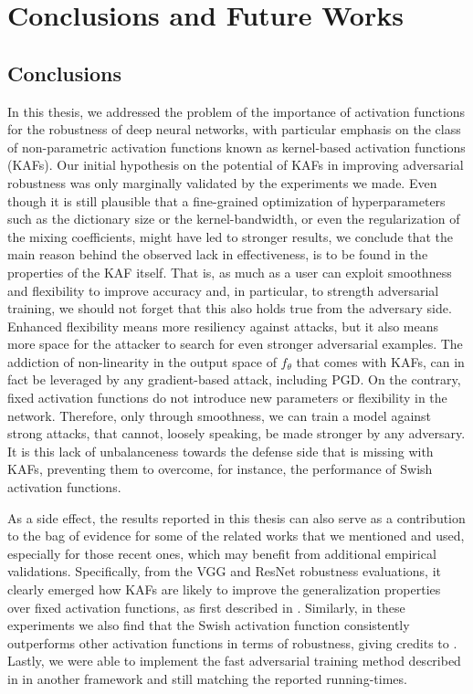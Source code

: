 \documentclass[LaM,binding=0.6cm]{./packages/sapthesis/sapthesis}
\begin{document}
\chapter{Conclusions and Future Works}

        \label{chap:8}
        \section{Conclusions}

        In this thesis, we addressed the problem of the importance of activation functions for the robustness of deep neural networks, 
        with particular emphasis on the class of non-parametric activation functions known as kernel-based activation functions (KAFs).
        Our initial hypothesis on the potential of KAFs in improving adversarial robustness was only marginally validated by the experiments we made. Even though
        it is still plausible that a fine-grained optimization of hyperparameters such as the dictionary size or the kernel-bandwidth,
        or even the regularization of the mixing coefficients, might have led to stronger results, we conclude that the main reason behind the 
        observed lack in effectiveness, is to be found in the properties of the KAF itself. That is, as much as a user can exploit 
        smoothness and flexibility to improve accuracy and, in particular, to strength adversarial training, we should not forget that this also holds 
        true from the adversary side. Enhanced flexibility means more resiliency against attacks, but it also means more space for the attacker to 
        search for even stronger adversarial examples. The addiction of non-linearity in the output space of $f_{\theta}$ that comes with KAFs, can in fact
        be leveraged by any gradient-based attack, including PGD. On the contrary, fixed activation functions do not introduce new parameters or flexibility in the network. Therefore,
        only through smoothness, we can train a model against strong attacks, that cannot, loosely speaking, be made stronger by any adversary.
        It is this lack of unbalanceness towards the defense side that is missing with KAFs, preventing them to overcome, for instance, the performance of Swish activation functions.

        As a side effect, the results reported in this thesis can also serve as a contribution to the bag of evidence for 
        some of the related works that we mentioned and used, especially for those recent ones, which may benefit from additional 
        empirical validations. Specifically, from the VGG and ResNet robustness evaluations, it clearly emerged how KAFs are likely to improve
        the generalization properties over fixed activation functions, as first described in \cite{kafnets}.
        Similarly, in these experiments we also find that the Swish activation function consistently outperforms 
        other activation functions in terms of robustness, giving credits to \cite{smooth_adversarial_training}. Lastly, we were able to implement
        the fast adversarial training method described in \cite{fast_adv_train} in another framework and still matching the reported
        running-times.
\end{document}
